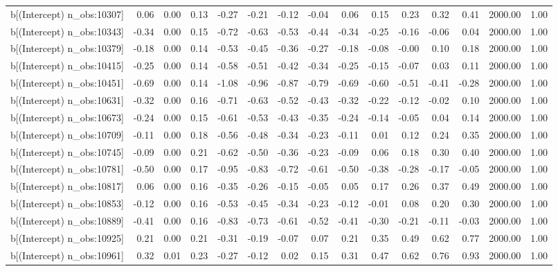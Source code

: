 \begin{table}[ht]
\begin{tabular}{rrrrrrrrrrrrrrr}
  b[(Intercept) n\_obs:10307] & 0.06 & 0.00 & 0.13 & -0.27 & -0.21 & -0.12 & -0.04 & 0.06 & 0.15 & 0.23 & 0.32 & 0.41 & 2000.00 & 1.00 \\ 
  b[(Intercept) n\_obs:10343] & -0.34 & 0.00 & 0.15 & -0.72 & -0.63 & -0.53 & -0.44 & -0.34 & -0.25 & -0.16 & -0.06 & 0.04 & 2000.00 & 1.00 \\ 
  b[(Intercept) n\_obs:10379] & -0.18 & 0.00 & 0.14 & -0.53 & -0.45 & -0.36 & -0.27 & -0.18 & -0.08 & -0.00 & 0.10 & 0.18 & 2000.00 & 1.00 \\ 
  b[(Intercept) n\_obs:10415] & -0.25 & 0.00 & 0.14 & -0.58 & -0.51 & -0.42 & -0.34 & -0.25 & -0.15 & -0.07 & 0.03 & 0.11 & 2000.00 & 1.00 \\ 
  b[(Intercept) n\_obs:10451] & -0.69 & 0.00 & 0.14 & -1.08 & -0.96 & -0.87 & -0.79 & -0.69 & -0.60 & -0.51 & -0.41 & -0.28 & 2000.00 & 1.00 \\ 
  b[(Intercept) n\_obs:10631] & -0.32 & 0.00 & 0.16 & -0.71 & -0.63 & -0.52 & -0.43 & -0.32 & -0.22 & -0.12 & -0.02 & 0.10 & 2000.00 & 1.00 \\ 
  b[(Intercept) n\_obs:10673] & -0.24 & 0.00 & 0.15 & -0.61 & -0.53 & -0.43 & -0.35 & -0.24 & -0.14 & -0.05 & 0.04 & 0.14 & 2000.00 & 1.00 \\ 
  b[(Intercept) n\_obs:10709] & -0.11 & 0.00 & 0.18 & -0.56 & -0.48 & -0.34 & -0.23 & -0.11 & 0.01 & 0.12 & 0.24 & 0.35 & 2000.00 & 1.00 \\ 
  b[(Intercept) n\_obs:10745] & -0.09 & 0.00 & 0.21 & -0.62 & -0.50 & -0.36 & -0.23 & -0.09 & 0.06 & 0.18 & 0.30 & 0.40 & 2000.00 & 1.00 \\ 
  b[(Intercept) n\_obs:10781] & -0.50 & 0.00 & 0.17 & -0.95 & -0.83 & -0.72 & -0.61 & -0.50 & -0.38 & -0.28 & -0.17 & -0.05 & 2000.00 & 1.00 \\ 
  b[(Intercept) n\_obs:10817] & 0.06 & 0.00 & 0.16 & -0.35 & -0.26 & -0.15 & -0.05 & 0.05 & 0.17 & 0.26 & 0.37 & 0.49 & 2000.00 & 1.00 \\ 
  b[(Intercept) n\_obs:10853] & -0.12 & 0.00 & 0.16 & -0.53 & -0.45 & -0.34 & -0.23 & -0.12 & -0.01 & 0.08 & 0.20 & 0.30 & 2000.00 & 1.00 \\ 
  b[(Intercept) n\_obs:10889] & -0.41 & 0.00 & 0.16 & -0.83 & -0.73 & -0.61 & -0.52 & -0.41 & -0.30 & -0.21 & -0.11 & -0.03 & 2000.00 & 1.00 \\ 
  b[(Intercept) n\_obs:10925] & 0.21 & 0.00 & 0.21 & -0.31 & -0.19 & -0.07 & 0.07 & 0.21 & 0.35 & 0.49 & 0.62 & 0.77 & 2000.00 & 1.00 \\ 
  b[(Intercept) n\_obs:10961] & 0.32 & 0.01 & 0.23 & -0.27 & -0.12 & 0.02 & 0.15 & 0.31 & 0.47 & 0.62 & 0.76 & 0.93 & 2000.00 & 1.00 \\ 

\end{tabular}
\end{table}
